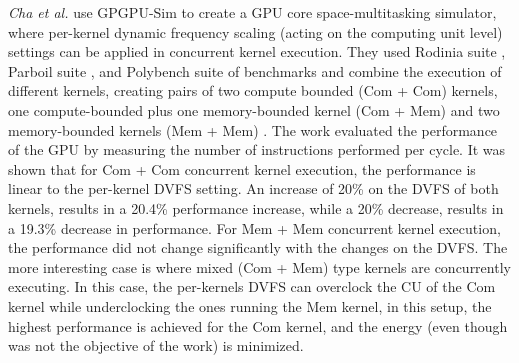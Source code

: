 \textit{Cha et al.} \cite{cha_core-level_2018} use GPGPU-Sim to create a GPU core space-multitasking simulator, where per-kernel dynamic frequency scaling (acting on the computing unit level) settings can be applied in concurrent kernel execution. They used Rodinia suite \cite{che_rodinia:_2009}, Parboil suite \cite{stratton_parboil:_nodate}, and Polybench suite \cite{noauthor_polybench/c_nodate} of benchmarks and combine the execution of different kernels, creating pairs of two compute bounded (Com + Com) kernels, one compute-bounded plus one memory-bounded kernel (Com + Mem) and two memory-bounded kernels (Mem + Mem) . The work evaluated the performance of the GPU by measuring the number of instructions performed per cycle. It was shown that for Com + Com concurrent kernel execution, the performance is linear to the per-kernel DVFS setting. An increase of 20\% on the DVFS of both kernels, results in a 20.4\% performance increase, while a 20\% decrease, results in a 19.3\% decrease in performance. For Mem + Mem concurrent kernel execution, the performance did not change significantly with the changes on the DVFS. The more interesting case is where mixed (Com + Mem) type kernels are concurrently executing. In this case, the per-kernels DVFS can overclock the CU of the Com kernel while underclocking the ones running the Mem kernel, in this setup, the highest performance is achieved for the Com kernel, and the energy (even though was not the objective of the work) is minimized.







